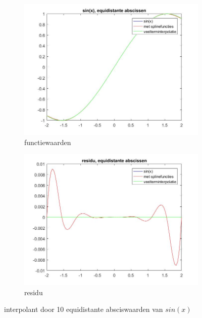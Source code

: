 \begin{figure}
\centering
\begin{subfigure}{.5\textwidth}
  \centering
  \includegraphics[width=\linewidth]{afbeeldingen/sin_equi.jpg}
  \caption{functiewaarden}
\end{subfigure}%
\begin{subfigure}{.5\textwidth}
  \centering
  \includegraphics[width=\linewidth]{afbeeldingen/sin_equi_res.jpg}
  \caption{residu}
\end{subfigure}
\caption{interpolant door 10 equidistante absciswaarden van $sin(x)$}
\label{fig:sinequi}
\end{figure}

